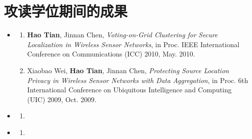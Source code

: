 \chapter{攻读学位期间的成果}

\begin{itemize}
	\setlength{\itemsep}{5pt}
	
	\item \textbf{\heiti{}}
	      \begin{enumerate}
	      	\setlength{\itemsep}{-\itemsep}  %
	      	
	      	      
  	     \item \textbf{Hao Tian}, Jinnan Chen, \emph{Voting-on-Grid Clustering for Secure Localization in Wireless Sensor Networks}, in Proc. IEEE International Conference on Communications (ICC) 2010, May. 2010.
        \item Xiaobao Wei, \textbf{Hao Tian}, Jinnan Chen, \emph{Protecting Source Location Privacy in Wireless Sensor Networks with Data Aggregation}, in Proc. 6th International Conference on Ubiquitous Intelligence and Computing (UIC) 2009, Oct. 2009.
	      	      
	      \end{enumerate}
	      
	  \item \textbf{\heiti{}}
	      \begin{enumerate}
	      	\item 
	      \end{enumerate}
	      
	\item \textbf{\heiti{}}
	      \begin{enumerate}
	      	\item 
	      \end{enumerate}
	      

	      
\end{itemize}
